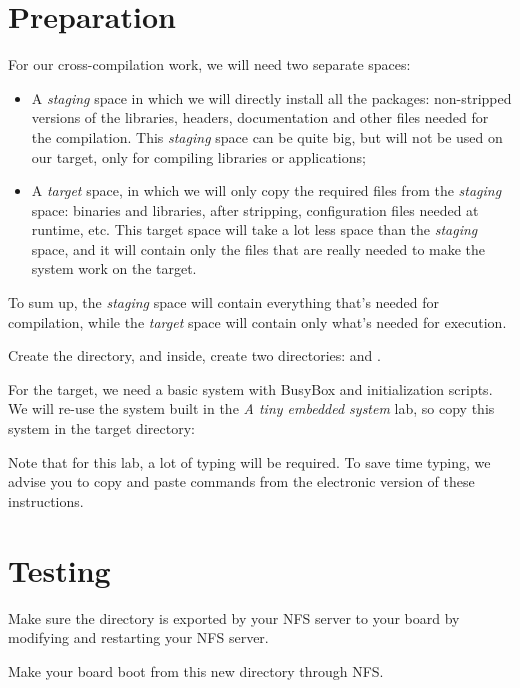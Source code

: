 \section{Preparation}

For our cross-compilation work, we will need two separate spaces:
\begin{itemize}
\item A \emph{staging} space in which we will directly install all the
  packages: non-stripped versions of the libraries, headers,
  documentation and other files needed for the compilation. This
  \emph{staging} space can be quite big, but will not be used on our
  target, only for compiling libraries or applications;
\item A \emph{target} space, in which we will only copy the required
  files from the \emph{staging} space: binaries and libraries, after
  stripping, configuration files needed at runtime, etc. This target
  space will take a lot less space than the \emph{staging} space, and
  it will contain only the files that are really needed to make the
  system work on the target.
\end{itemize}

To sum up, the {\em staging} space will contain everything that's
needed for compilation, while the {\em target} space will contain only
what's needed for execution.

Create the  directory,
and inside, create two directories:  and .

For the target, we need a basic system with BusyBox and
initialization scripts. We will re-use the system built in the {\em A
  tiny embedded system} lab, so copy this system in the target
directory:


Note that for this lab, a lot of typing will be required. To save time
typing, we advise you to copy and paste commands from the electronic
version of these instructions.

\section{Testing}

Make sure the  directory is exported by your NFS server
to your board by modifying  and restarting your NFS
server.

Make your board boot from this new directory through NFS.

